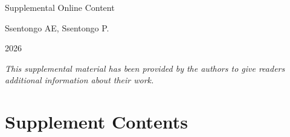 \documentclass[11pt]{article}
\begin{document}
\begin{center}{\LARGE Supplemental Online Content\par}\vspace{1em}{\large Early-Life Infections and Later Autism and Attention-Deficit/Hyperactivity Disorder\par}\vspace{0.8em}Ssentongo AE, Ssentongo P.\par\vspace{0.4em}2026\end{center}\vspace{1em}\noindent\textit{This supplemental material has been provided by the authors to give readers additional information about their work.}

\section*{Supplement Contents}
\end{document}

